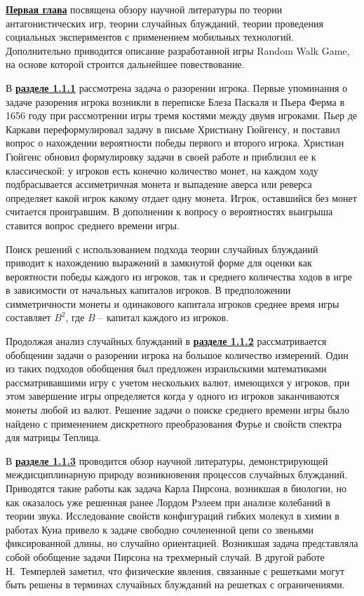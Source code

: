 \underline{\textbf{Первая глава}} посвящена обзору научной литературы 
по теории антагонистических игр, теории случайных блужданий, теории проведения социальных экспериментов
с применением мобильных технологий. Дополнительно приводится описание 
разработанной игры Random Walk Game, на основе которой строится дальнейшее повествование.

В \underline{\textbf{разделе 1.1.1}} рассмотрена задача о разорении игрока.
Первые упоминания о задаче разорения игрока возникли в переписке
Блеза Паскаля и Пьера Ферма в 1656 году при рассмотрении игры тремя костями
между двумя игроками. Пьер де Каркави переформулировал задачу в письме Христиану Гюйгенсу, 
и поставил вопрос о нахождении вероятности победы первого и второго игрока.
Христиан Гюйгенс обновил формулировку задачи в своей работе и приблизил ее к классической:
у игроков есть конечно количество монет, на каждом ходу подбрасывается ассиметричная монета
и выпадение аверса или реверса определяет какой игрок какому отдает одну монета.
Игрок, оставшийся без монет считается проигравшим. В дополнении к вопросу о вероятностях выигрыша 
ставится вопрос среднего времени игры.

Поиск решений с использованием подхода теории случайных блужданий приводит к нахождению выражений в замкнутой форме 
для оценки как вероятности победы каждого из игроков, так и среднего количества ходов в игре в зависимости от начальных капиталов игроков.
В предположении симметричности монеты и одинакового капитала игроков среднее время игры составляет $B^2$, где $B$ -- капитал каждого из игроков.

Продолжая анализ случайных блужданий в \underline{\textbf{разделе 1.1.2}} рассматривается
обобщении задачи о разорении игрока на большое количество измерений.
Один из таких подходов обобщения был предложен израильскими математиками рассматривавшими игру 
с учетом нескольких валют, имеющихся у игроков, при этом завершение игры определяется
когда у одного из игроков заканчиваются монеты любой из валют. 
Решение задачи о поиске среднего времени игры было найдено с применением дискретного преобразования Фурье
и свойств спектра для матрицы Теплица. 

В \underline{\textbf{разделе 1.1.3}} проводится обзор научной литературы, демонстрирующей
междисциплинарную природу возникновения процессов случайных блужданий. Приводятся
такие работы как задача Карла Пирсона, возникшая в биологии, но как оказалось уже решенная ранее
Лордом Рэлеем при анализе колебаний в теории звука. Исследование свойств конфигураций гибких молекул 
в химии в работах Куна привело к задаче свободно сочлененной цепи со звеньями фиксированной длины,
но случайно ориентацией. Возникшая задача представляла собой обобщение задачи Пирсона на 
трехмерный случай. В другой работе Н.~Темперлей заметил, что физические явления, связанные с решетками
могут быть решены в терминах случайных блужданий на решетках с ограничениями.


